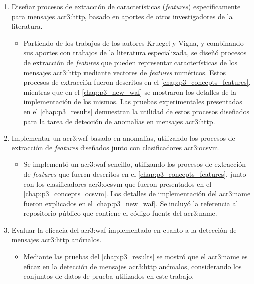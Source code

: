 \begin{enumerate}
    \item
    Diseñar procesos de extracción de características (\textit{features})
    específicamente para mensajes \gls{acr3:http}, basado en aportes de
    otros investigadores de la literatura.

    \begin{itemize}
        \item
        Partiendo de los trabajos de los autores Kruegel y Vigna, y
        combinando sus aportes con trabajos de la literatura especializada,
        se diseñó procesos de extracción de \textit{features} que pueden
        representar características de los mensajes \gls{acr3:http}
        mediante vectores de \textit{features} numéricos.
        Estos procesos de extracción fueron descritos en el
        \autoref{chap:p3_concepts_features}, mientras que en el
        \autoref{chap:p3_new_waf} se mostraron los detalles de la
        implementación de los mismos.
        Las pruebas experimentales presentadas en el \autoref{chap:p3_results}
        demuestran la utilidad de estos procesos diseñados para la tarea
        de detección de anomalías en mensajes \gls{acr3:http}.
    \end{itemize}

    \item
    Implementar un \gls{acr3:waf} basado en anomalías, utilizando los
    procesos de extracción de \textit{features} diseñados junto con
    clasificadores \gls{acr3:ocsvm}.

    \begin{itemize}
        \item
        Se implementó un \gls{acr3:waf} sencillo, utilizando los procesos
        de extracción de \textit{features} que fueron descritos en el
        \autoref{chap:p3_concepts_features}, junto con los clasificadores
        \gls{acr3:ocsvm} que fueron presentados en el
        \autoref{chap:p3_concepts_ocsvm}.
        Los detalles de implementación del \gls{acr3:name} fueron explicados
        en el \autoref{chap:p3_new_waf}. Se incluyó la referencia al
        repositorio público que contiene el código fuente del \gls{acr3:name}.
    \end{itemize}

    \item
    Evaluar la eficacia del \gls{acr3:waf} implementado en cuanto a la
    detección de mensajes \gls{acr3:http} anómalos.

    \begin{itemize}
        \item
        Mediante las pruebas del \autoref{chap:p3_results} se mostró
        que el \gls{acr3:name} es eficaz en la detección de mensajes
        \gls{acr3:http} anómalos, considerando los conjuntos de datos
        de prueba utilizados en este trabajo.
    \end{itemize}


\end{enumerate}
